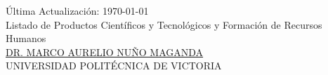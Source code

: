\documentclass[a4paper,10pt]{article}
\begin{document}
\begin{center}
\small \'Ultima Actualizaci\'on: \today\ \\
{\Huge {Listado de Productos Científicos y Tecnológicos y Formación de Recursos Humanos\\
 }
\normalsize
\underline{DR. MARCO AURELIO NU\~{N}O MAGANDA} \\
UNIVERSIDAD POLITÉCNICA DE VICTORIA \\
}
\end{center}



\nocite{*} 

\medskip




\printbibliography
\end{document}
